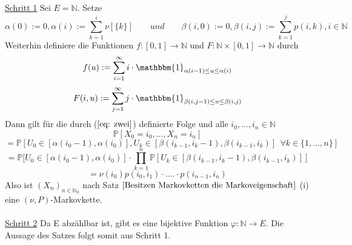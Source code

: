 \underline{Schritt 1} Sei $E = \mathbb{N}$. Setze
\\
\begin{equation}
\label{eq: zwei}
\alpha(0) := 0, \alpha(i) := \sum_{k=1}^{i} \nu[\lbrace k \rbrace] \qquad und \qquad \beta(i,0) := 0, \beta(i,j) := \sum_{k=1}^{j} p(i,k) , i \in \mathbb{N}
\end{equation}
Weiterhin definiere die Funktionen $f:[0,1] \to \mathbb{N}$ und $F:\mathbb{N} \times [0,1] \to \mathbb{N}$ durch
\begin{equation*}
f(u) := \sum_{i=1}^{\infty} i \cdot \mathbbm{1}_{\alpha(i-1)\leq u \leq \alpha(i) }
\end{equation*}
\begin{equation*}
F(i,u) := \sum_{j=1}^{\infty} j \cdot \mathbbm{1}_{\beta(i,j-1)\leq u \leq \beta(i,j) }
\end{equation*}
Dann gilt für die durch ($\ref{eq: zwei}$) definierte Folge und alle $i_{0},...,i_{n} \in \mathbb{N}$
\begin{equation*}
\mathbb{P}[X_{0} = i_{0},...,X_{n} = i_{n}]
\end{equation*}
\begin{equation*}
= \mathbb{P}[U_{0} \in [\alpha(i_{0} - 1),\alpha(i_{0})], U_{k} \in [\beta(i_{k-1},i_{k} -1),\beta(i_{k-1},i_{k})] \: \: \forall k  \in \lbrace 1,...,n \rbrace ]
\end{equation*}
\begin{equation*}
\stackrel{}{=} \mathbb{P}[U_{0} \in [\alpha(i_{0} - 1),\alpha(i_{0})] \cdot \prod_{k=1}^{n} \mathbb{P}[ U_{k} \in [\beta(i_{k-1},i_{k} -1),\beta(i_{k-1},i_{k})]]
\end{equation*}
\begin{equation*}
= \nu(i_{0})p(i_{0},i_{1}) \cdot .... \cdot p(i_{n-1},i_{n})   
\end{equation*}
Also ist $(X_{n})_{n \in \mathbb{N}_{0}}$ nach Satz $\ref{Besitzen Markovketten die Markoveigenschaft}$ (i) eine $(\nu,P)$-Markovkette.
\\
\\
\underline{Schritt 2} Da E abzählbar ist, gibt es eine bijektive Funktion $\varphi: \mathbb{N} \to E$. Die Aussage des Satzes folgt somit aus Schritt 1. 